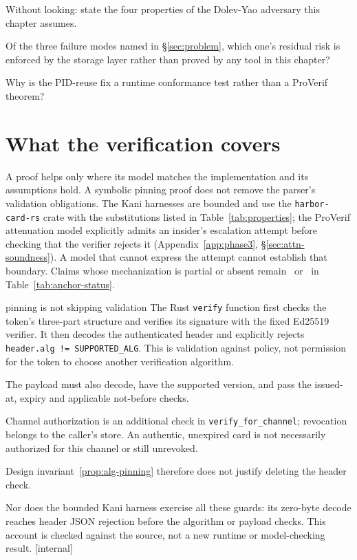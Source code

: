 \documentclass[11pt,a4paper]{article}
\theoremstyle{definition}
\begin{document}
\pdexercisepointerone*{\ref{ex:anchor-security-envelope}}{\pageref{ex:anchor-security-envelope}}
\begin{pdrecitation}
\item Without looking: state the four properties of the Dolev-Yao adversary this chapter assumes.
\item Of the three failure modes named in \S\ref{sec:problem}, which one's residual risk is enforced by the storage layer rather than proved by any tool in this chapter?
\item Why is the PID-reuse fix a runtime conformance test rather than a ProVerif theorem?
\end{pdrecitation}


\section{What the verification covers}\label{sec:conclusion}

A proof helps only where its model matches the implementation and its assumptions hold. A symbolic pinning proof does not remove the parser's validation obligations. The Kani harnesses are bounded and use the \texttt{harbor-card-rs} crate with the substitutions listed in Table~\ref{tab:properties}; the ProVerif attenuation model explicitly admits an insider's escalation attempt before checking that the verifier rejects it (Appendix~\ref{app:phase3}, \S\ref{sec:attn-soundness}). A model that cannot express the attempt cannot establish that boundary. Claims whose mechanization is partial or absent remain \Partial\ or \Open\ in Table~\ref{tab:anchor-status}.

\begin{pdexample}{pinning is not skipping validation}
\setlength{\parskip}{4pt plus 1pt}
The Rust \texttt{verify} function first checks the token's three-part structure
and verifies its signature with the fixed Ed25519 verifier. It then decodes
the authenticated header and explicitly rejects
\texttt{header.alg != SUPPORTED\_ALG}. This is validation against policy,
not permission for the token to choose another verification algorithm.

The payload must also decode, have the supported version, and pass the
issued-at, expiry and applicable not-before checks.

Channel authorization is
an additional check in \texttt{verify\_for\_channel}; revocation belongs to
the caller's store. An authentic, unexpired card is not necessarily authorized
for this channel or still unrevoked.

Design invariant~\ref{prop:alg-pinning} therefore does not justify deleting
the header check.

Nor does the bounded Kani harness exercise all these guards:
its zero-byte decode reaches header JSON rejection before the algorithm or
payload checks. This account is checked against the source, not a new runtime
or model-checking result.
[internal]
\end{pdexample}
\end{document}
